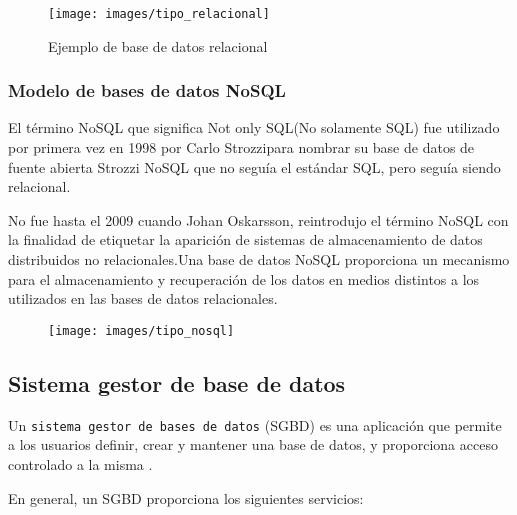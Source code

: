 \begin{figure}[!h]
	\centering
	\texttt{[image: images/tipo\_relacional]}
	\caption{Ejemplo de base de datos relacional}
	\label{fig:bd_relacional}
\end{figure}

\subsubsection*{Modelo de bases de datos NoSQL}

El término NoSQL que significa Not only SQL(No solamente SQL) fue utilizado por primera vez en 1998 por Carlo Strozzipara nombrar su base de datos de fuente abierta Strozzi NoSQL que no seguía el estándar SQL, pero seguía siendo relacional.

No fue hasta el 2009 cuando Johan Oskarsson, reintrodujo el término NoSQL con la finalidad de etiquetar la aparición de sistemas de almacenamiento de datos distribuidos no relacionales.Una base de datos NoSQL proporciona un mecanismo para el almacenamiento y recuperación de los datos en medios distintos a los utilizados en las bases de datos relacionales.

\begin{figure}[!h]
	\centering
	\texttt{[image: images/tipo\_nosql]}
	\label{fig:bd_nosql}
\end{figure}

\newpage

\subsection*{Sistema gestor de base de datos}

Un \texttt{sistema gestor de bases de datos} (SGBD) es una aplicación que permite a los usuarios definir, crear y mantener una base de datos, y proporciona acceso controlado a la misma \cite{ref5}.

En general, un SGBD proporciona los siguientes servicios:

